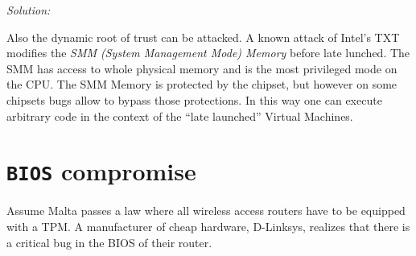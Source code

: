 \documentclass[a4paper,11pt]{article}
\newenvironment{solution}%
{\par{\noindent\small\textit{Solution:}}\vspace{-12pt}\begin{framed}}%
{\end{framed}\par}
\begin{document}
\begin{enumerate}[(a)]
\begin{solution}
Also the dynamic root of trust can be attacked. A known attack of Intel's TXT  modifies the \emph{SMM (System Management Mode) 
Memory} before late lunched. The SMM has access to whole physical memory and is the most privileged mode on the CPU. 
The SMM Memory is protected by the chipset, but however on some chipsets bugs allow to bypass those protections. 
In this way one can execute arbitrary code in the context of the ``late launched'' Virtual Machines. 
\end{solution}\fi

\end{enumerate}

\section{\texttt{BIOS} compromise}

Assume Malta passes a law where all wireless access routers
have to be equipped with a TPM. A manufacturer of cheap hardware, D-Linksys,
realizes that there is a critical bug in the BIOS of their router.
\end{document}
